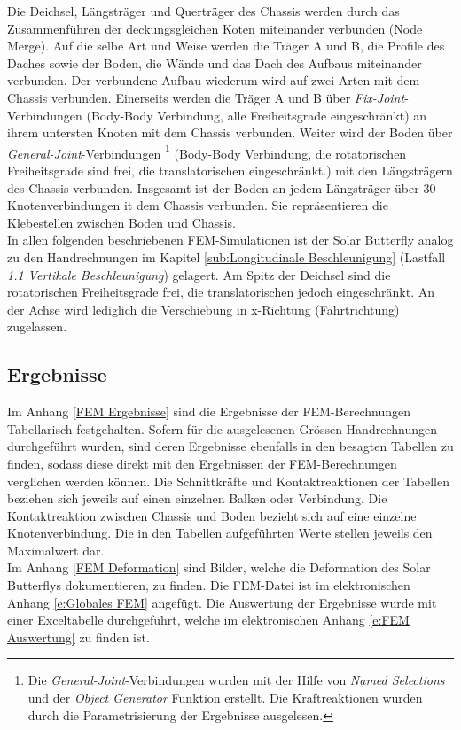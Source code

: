 Die Deichsel, Längsträger und Querträger des Chassis werden durch das Zusammenführen der deckungsgleichen Koten miteinander verbunden (Node Merge). Auf die selbe Art und Weise werden die Träger A und B, die Profile des Daches sowie der Boden, die Wände und das Dach des Aufbaus miteinander verbunden. Der verbundene Aufbau wiederum wird auf zwei Arten mit dem Chassis verbunden. Einerseits werden die Träger A und B über \emph{Fix-Joint}-Verbindungen (Body-Body Verbindung, alle Freiheitsgrade eingeschränkt) an ihrem untersten Knoten mit dem Chassis verbunden. Weiter wird der Boden über \emph{General-Joint}-Verbindungen%
\footnote{Die \emph{General-Joint}-Verbindungen wurden mit der Hilfe von \emph{Named Selections} und der \emph{Object Generator} Funktion erstellt. Die Kraftreaktionen wurden durch die Parametrisierung der Ergebnisse ausgelesen.}
(Body-Body Verbindung, die rotatorischen Freiheitsgrade sind frei, die translatorischen eingeschränkt.) mit den Längsträgern des Chassis verbunden. Insgesamt ist der Boden an jedem Längsträger über 30 Knotenverbindungen it dem Chassis verbunden. Sie repräsentieren die Klebestellen zwischen Boden und Chassis.\\
In allen folgenden beschriebenen FEM-Simulationen ist der Solar Butterfly analog zu den Handrechnungen im Kapitel \ref{sub:Longitudinale Beschleunigung} (Lastfall \emph{1.1 Vertikale Beschleunigung}) gelagert. Am Spitz der Deichsel sind die rotatorischen Freiheitsgrade frei, die translatorischen jedoch eingeschränkt. An der Achse wird lediglich die Verschiebung in x-Richtung (Fahrtrichtung) zugelassen.


\subsection{Ergebnisse}
Im Anhang \ref{FEM Ergebnisse} sind die Ergebnisse der FEM-Berechnungen Tabellarisch festgehalten. Sofern für die ausgelesenen Grössen Handrechnungen durchgeführt wurden, sind deren Ergebnisse ebenfalls in den besagten Tabellen zu finden, sodass diese direkt mit den Ergebnissen der FEM-Berechnungen verglichen werden können. Die Schnittkräfte und Kontaktreaktionen der Tabellen beziehen sich jeweils auf einen einzelnen Balken oder Verbindung. Die Kontaktreaktion zwischen Chassis und Boden bezieht sich auf eine einzelne Knotenverbindung. Die in den Tabellen aufgeführten Werte stellen jeweils den Maximalwert dar.\\
Im Anhang \ref{FEM Deformation} sind Bilder, welche die Deformation des Solar Butterflys dokumentieren, zu finden. Die FEM-Datei ist im elektronischen Anhang \ref{e:Globales FEM} angefügt. Die Auswertung der Ergebnisse wurde mit einer Exceltabelle durchgeführt, welche im elektronischen Anhang \ref{e:FEM Auswertung} zu finden ist.

